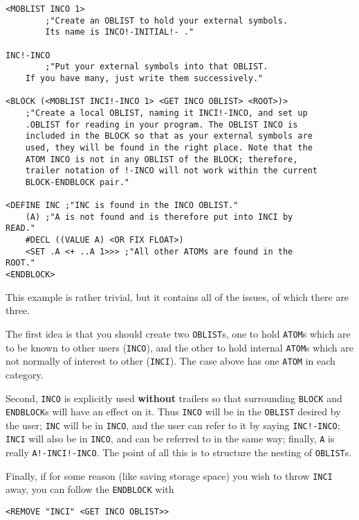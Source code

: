 \documentclass[a4paper,]{article}
\begin{document}
\begin{verbatim}
<MOBLIST INCO 1>
        ;"Create an OBLIST to hold your external symbols.
        Its name is INCO!-INITIAL!- ."

INC!-INCO
        ;"Put your external symbols into that OBLIST.
    If you have many, just write them successively."

<BLOCK (<MOBLIST INCI!-INCO 1> <GET INCO OBLIST> <ROOT>)>
    ;"Create a local OBLIST, naming it INCI!-INCO, and set up
    .OBLIST for reading in your program. The OBLIST INCO is
    included in the BLOCK so that as your external symbols are
    used, they will be found in the right place. Note that the
    ATOM INCO is not in any OBLIST of the BLOCK; therefore,
    trailer notation of !-INCO will not work within the current
    BLOCK-ENDBLOCK pair."

<DEFINE INC ;"INC is found in the INCO OBLIST."
    (A) ;"A is not found and is therefore put into INCI by
READ."
    #DECL ((VALUE A) <OR FIX FLOAT>)
    <SET .A <+ ..A 1>>> ;"All other ATOMs are found in the
ROOT."
<ENDBLOCK>
\end{verbatim}

This example is rather trivial, but it contains all of the issues, of which there are three.

The first idea is that you should create two \texttt{OBLIST}s, one to hold \texttt{ATOM}s which are to be known to other
users (\texttt{INCO}), and the other to hold internal \texttt{ATOM}s which are not normally of interest to other
(\texttt{INCI}). The case above has one \texttt{ATOM} in each category.

Second, \texttt{INCO} is explicitly used \textbf{without} trailers so that surrounding \texttt{BLOCK} and
\texttt{ENDBLOCK}s will have an effect on it. Thus \texttt{INCO} will be in the \texttt{OBLIST} desired by the user;
\texttt{INC} will be in \texttt{INCO}, and the user can refer to it by saying \texttt{INC!-INCO}; \texttt{INCI} will also
be in \texttt{INCO}, and can be referred to in the same way; finally, \texttt{A} is really \texttt{A!-INCI!-INCO}. The
point of all this is to structure the nesting of \texttt{OBLIST}s.

Finally, if for some reason (like saving storage space) you wish to throw \texttt{INCI} away, you can follow the
\texttt{ENDBLOCK} with

\begin{verbatim}
<REMOVE "INCI" <GET INCO OBLIST>>
\end{verbatim}
\end{document}
